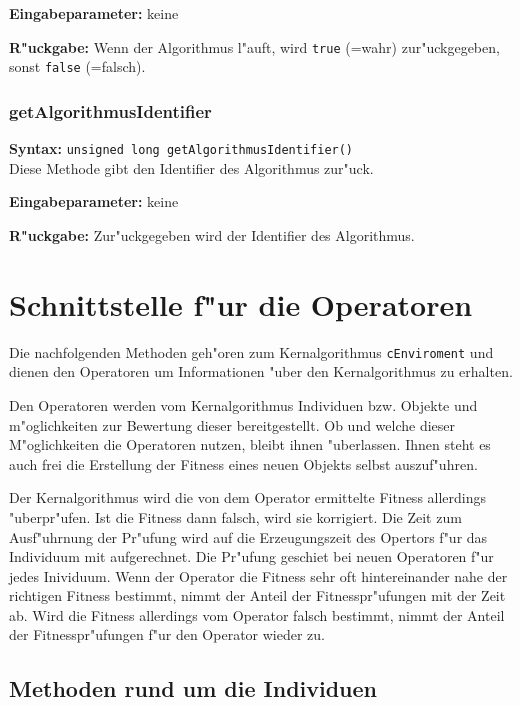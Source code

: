 \bigskip\noindent
\textbf{Eingabeparameter:} keine

\bigskip\noindent
\textbf{R"uckgabe:} Wenn der Algorithmus l"auft, wird \verb|true| (=wahr) zur"uckgegeben, sonst \verb|false| (=falsch).


\subsubsection{getAlgorithmusIdentifier}

\textbf{Syntax:} \verb|unsigned long getAlgorithmusIdentifier()| \\

Diese Methode gibt den Identifier des Algorithmus zur"uck.

\bigskip\noindent
\textbf{Eingabeparameter:} keine

\bigskip\noindent
\textbf{R"uckgabe:} Zur"uckgegeben wird der Identifier des Algorithmus.


\section{Schnittstelle f"ur die Operatoren}

Die nachfolgenden Methoden geh"oren zum Kernalgorithmus \verb|cEnviroment| und dienen den Operatoren um Informationen "uber den Kernalgorithmus zu erhalten.

Den Operatoren werden vom Kernalgorithmus Individuen bzw. Objekte und m"oglichkeiten zur Bewertung dieser bereitgestellt.
Ob und welche dieser M"oglichkeiten die Operatoren nutzen, bleibt ihnen "uberlassen. Ihnen steht es auch frei die Erstellung der Fitness eines neuen Objekts selbst auszuf"uhren.

Der Kernalgorithmus wird die von dem Operator ermittelte Fitness allerdings "uberpr"ufen. Ist die Fitness dann falsch, wird sie korrigiert. Die Zeit zum Ausf"uhrnung der Pr"ufung wird auf die Erzeugungszeit des Opertors f"ur das Individuum mit aufgerechnet.
Die Pr"ufung geschiet bei neuen Operatoren f"ur jedes Inividuum. Wenn der Operator die Fitness sehr oft hintereinander nahe der richtigen Fitness bestimmt, nimmt der Anteil der Fitnesspr"ufungen mit der Zeit ab. Wird die Fitness allerdings vom Operator falsch bestimmt, nimmt der Anteil der Fitnesspr"ufungen f"ur den Operator wieder zu.


\subsection{Methoden rund um die Individuen}

